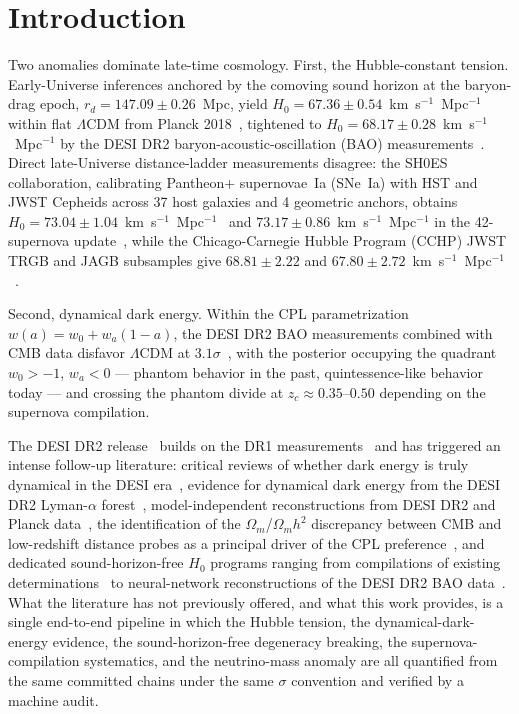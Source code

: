 \documentclass[aps,prd,preprint,superscriptaddress,nofootinbib]{revtex4-2}
\begin{document}
\section{Introduction}
\label{sec:intro}

Two anomalies dominate late-time cosmology. First, the Hubble-constant tension. Early-Universe inferences anchored by the comoving sound horizon at the baryon-drag epoch, $r_d = 147.09 \pm 0.26$~Mpc, yield $H_0 = 67.36 \pm 0.54$~km~s$^{-1}$~Mpc$^{-1}$ within flat $\Lambda$CDM from Planck 2018~\cite{Planck2020}, tightened to $H_0 = 68.17 \pm 0.28$~km~s$^{-1}$~Mpc$^{-1}$ by the DESI DR2 baryon-acoustic-oscillation (BAO) measurements~\cite{DESI2025}. Direct late-Universe distance-ladder measurements disagree: the SH0ES collaboration, calibrating Pantheon+ supernovae~Ia (SNe~Ia) with HST and JWST Cepheids across 37 host galaxies and 4 geometric anchors, obtains $H_0 = 73.04 \pm 1.04$~km~s$^{-1}$~Mpc$^{-1}$~\cite{Riess2022} and $73.17 \pm 0.86$~km~s$^{-1}$~Mpc$^{-1}$ in the 42-supernova update~\cite{Riess2024}, while the Chicago-Carnegie Hubble Program (CCHP) JWST TRGB and JAGB subsamples give $68.81 \pm 2.22$ and $67.80 \pm 2.72$~km~s$^{-1}$~Mpc$^{-1}$~\cite{Freedman2025,Lee2025}.

Second, dynamical dark energy. Within the CPL parametrization $w(a) = w_0 + w_a(1-a)$, the DESI DR2 BAO measurements combined with CMB data disfavor $\Lambda$CDM at $3.1\sigma$~\cite{DESI2025,Lodha2025}, with the posterior occupying the quadrant $w_0 > -1$, $w_a < 0$ --- phantom behavior in the past, quintessence-like behavior today --- and crossing the phantom divide at $z_c \approx 0.35$--$0.50$ depending on the supernova compilation.

The DESI DR2 release~\cite{DESI2025} builds on the DR1 measurements~\cite{Adame2024} and has triggered an intense follow-up literature: critical reviews of whether dark energy is truly dynamical in the DESI era~\cite{Capozziello2025}, evidence for dynamical dark energy from the DESI DR2 Lyman-$\alpha$ forest~\cite{Capozziello2026}, model-independent reconstructions from DESI DR2 and Planck data~\cite{WangFreese2026}, the identification of the $\Omega_m$/$\Omega_m h^2$ discrepancy between CMB and low-redshift distance probes as a principal driver of the CPL preference~\cite{Zaldarriaga2026}, and dedicated sound-horizon-free $H_0$ programs ranging from compilations of existing determinations~\cite{Pantos2026} to neural-network reconstructions of the DESI DR2 BAO data~\cite{Gadbail2026}. What the literature has not previously offered, and what this work provides, is a single end-to-end pipeline in which the Hubble tension, the dynamical-dark-energy evidence, the sound-horizon-free degeneracy breaking, the supernova-compilation systematics, and the neutrino-mass anomaly are all quantified from the same committed chains under the same $\sigma$ convention and verified by a machine audit.
\end{document}
